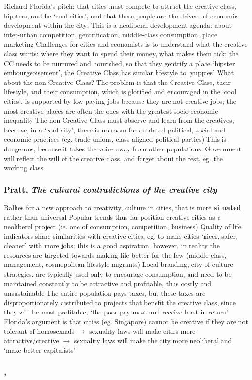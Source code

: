 \documentclass{article}
\begin{document}
\begin{outline}
	\1 Richard Florida's pitch: that cities must compete to attract the creative class, hipsters, and be `cool cities', and that these people are the drivers of economic development within the city; 
		\2 This is a neoliberal development agenda: about inter-urban competition, gentrification, middle-class consumption, place marketing
	\1 Challenges for cities and economists is to understand what the creative class wants: where they want to spend their money, what makes them tick; the CC needs to be nurtured and nourished, so that they gentrify a place 
	\1 `hipster embourgeoisement', the Creative Class has similar lifestyle to `yuppies'
	\1 What about the non-Creative Class?
		\2 The problem is that the Creative Class, their lifestyle, and their consumption, which is glorified and encouraged in the `cool cities', is supported by low-paying jobs because they are not creative jobs; the most creative places are often the ones with the greatest socio-economic inequality
		\2 The non-Creative Class must observe and learn from the creatives, because, in a `cool city', there is no room for outdated political, social and economic practices (eg. trade unions, class-aligned political parties)
		\2 This is dangerous, because it takes the voice away from other populations. Government will reflect the will of the creative class, and forget about the rest, eg. the working class
\end{outline}

\subsubsection{Pratt, \textit{The cultural contradictions of the creative city}}

\begin{outline}
	\1 Rallies for a new approach to creativity, culture in cities, that is more \textbf{situated} rather than universal
	\1 Popular trends thus far position creative cities as a neoliberal project (ie. one of consumption, competition, business)
	\1 Quality of life indicators share similarities with creative cities, eg. to make cities `nicer, safer, cleaner' with more jobs; this is a good aspiration, however, in reality the resources are targeted towards making life better for the few (middle class, management, cosmopolitan lifestyle migrants)
	\1 Local branding, city of culture strategies, are typically used only to encourage consumption, and need to be maintained constantly to be attractive and profitable, thus costly and unsustainable 
	\1 The entire population pays taxes, but these taxes are disproportionately distributed to projects that benefit the creative class, since they will be most profitable; `the poor pay most and receive least in return'
	\1 Florida's argument is that cities (eg. Singapore) cannot be creative if they are not tolerant of homosexuals $\rightarrow$ sexuality laws will make cities more attractive/creative $\rightarrow$ sexuality laws will make the city more neoliberal and `make better capitalists'
	\1
\end{outline}


\subsubsection{, \textit{}}

\begin{outline}
	\1
\end{outline}
\end{document}
